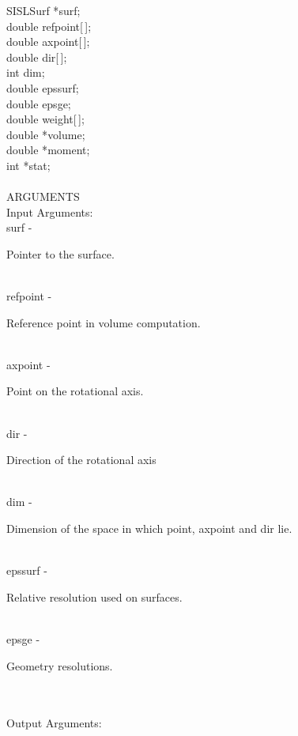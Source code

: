 		\>\>	SISLSurf	\> 	*{\fov surf};\\
		\>\>	double	\>	{\fov refpoint}[\,];\\
		\>\>	double	\>	{\fov axpoint}[\,];\\
		\>\>	double 	\>	{\fov dir}[\,];\\
		\>\>	int 	\>	{\fov dim};\\
		\>\>	double	\>	{\fov epssurf};\\
		\>\>	double 	\>	{\fov epsge};\\
		\>\>	double 	\>	{\fov weight}[\,];\\
		\>\>	double 	\>	*{\fov volume};\\
		\>\>	double	\>	*{\fov moment};\\
		\>\>	int 	\>	*{\fov stat};\\
\\
ARGUMENTS\\
	\>Input Arguments:\\
	\>\>	{\fov surf}\> - \>	\begin{minipg2}
				Pointer to the surface.
				\end{minipg2}\\
	\>\>	{\fov refpoint}\> - \>	\begin{minipg2}
				Reference point in volume computation.
				\end{minipg2}\\
	\>\>	{\fov axpoint}\> - \>		\begin{minipg2}
				Point on the rotational axis.
				\end{minipg2}\\
	\>\>	{\fov dir}\> - \>	\begin{minipg2}
				Direction of the rotational axis
				\end{minipg2} \\
	\>\>	{\fov dim}\> - \> 	\begin{minipg2}
				Dimension of the space in which point, axpoint and dir 
				lie.
				\end{minipg2}\\[0.8ex]
	\>\>	{\fov epssurf}\> - \>	\begin{minipg2}
				Relative resolution used on surfaces.
				\end{minipg2}\\
	\>\>	{\fov epsge}\> - \>	\begin{minipg2}
				Geometry resolutions.
				\end{minipg2}\\
\\
	\>Output Arguments:\\
